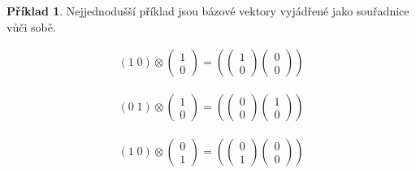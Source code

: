 \documentclass[a5paper,12pt]{amsbook}
\theoremstyle{definition}
\newtheorem{example}{Příklad}[chapter]
\begin{document}
\begin{example}
Nejjednodušší příklad jsou bázové vektory vyjádřené jako souřadnice vůči sobě.

\begin{equation*}
\begin{split}
\left(1 \; 0\right)\otimes\left(\begin{array}{c}1 \\ 0\end{array}\right)
=\left(
\left(\begin{array}{c}1 \\ 0\end{array}\right)
\left(\begin{array}{c}0 \\ 0\end{array}\right)
\right)
\end{split}
\end{equation*}

\begin{equation*}
\begin{split}
\left(0 \; 1\right)\otimes\left(\begin{array}{c}1 \\ 0\end{array}\right)
=\left(
\left(\begin{array}{c}0 \\ 0\end{array}\right)
\left(\begin{array}{c}1 \\ 0\end{array}\right)
\right)
\end{split}
\end{equation*}

\begin{equation*}
\begin{split}
\left(1 \; 0\right)\otimes\left(\begin{array}{c}0 \\ 1\end{array}\right)
=\left(
\left(\begin{array}{c}0 \\ 1\end{array}\right)
\left(\begin{array}{c}0 \\ 0\end{array}\right)
\right)
\end{split}
\end{equation*}


\end{example}
\end{document}
